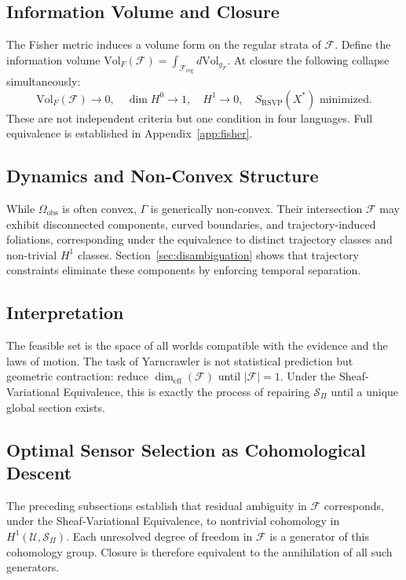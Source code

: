 \documentclass[12pt, oneside]{article}
\begin{document}
\subsection{Information Volume and Closure}

The Fisher metric induces a volume form on the regular strata of $\mathcal{F}$. Define
the information volume $\mathrm{Vol}_F(\mathcal{F}) = \int_{\mathcal{F}_{\mathrm{reg}}}
d\mathrm{Vol}_{g_F}$. At closure the following collapse simultaneously:
\[
\mathrm{Vol}_F(\mathcal{F}) \to 0,\quad
\dim H^0 \to 1,\quad
H^1 \to 0,\quad
S_{\mathrm{RSVP}}(X^*) \text{ minimized.}
\]
These are not independent criteria but one condition in four languages.
Full equivalence is established in Appendix~\ref{app:fisher}.

\subsection{Dynamics and Non-Convex Structure}

While $\Omega_{\mathrm{obs}}$ is often convex, $\Gamma$ is generically non-convex.
Their intersection $\mathcal{F}$ may exhibit disconnected components, curved boundaries,
and trajectory-induced foliations, corresponding under the equivalence to distinct
trajectory classes and non-trivial $H^1$ classes. Section~\ref{sec:disambiguation}
shows that trajectory constraints eliminate these components by enforcing temporal
separation.

\subsection{Interpretation}

The feasible set is the space of all worlds compatible with the evidence and the laws of
motion. The task of Yarncrawler is not statistical prediction but geometric contraction:
reduce $\dim_{\mathrm{eff}}(\mathcal{F})$ until $|\mathcal{F}| = 1$. Under the
Sheaf-Variational Equivalence, this is exactly the process of repairing $\mathcal{S}_\Pi$
until a unique global section exists.

\subsection{Optimal Sensor Selection as Cohomological Descent}

The preceding subsections establish that residual ambiguity in $\mathcal{F}$ corresponds,
under the Sheaf-Variational Equivalence, to nontrivial cohomology in
$H^1(\mathcal{U}, \mathcal{S}_\Pi)$. Each unresolved degree of freedom in $\mathcal{F}$
is a generator of this cohomology group. Closure is therefore equivalent to the
annihilation of all such generators.
\end{document}
